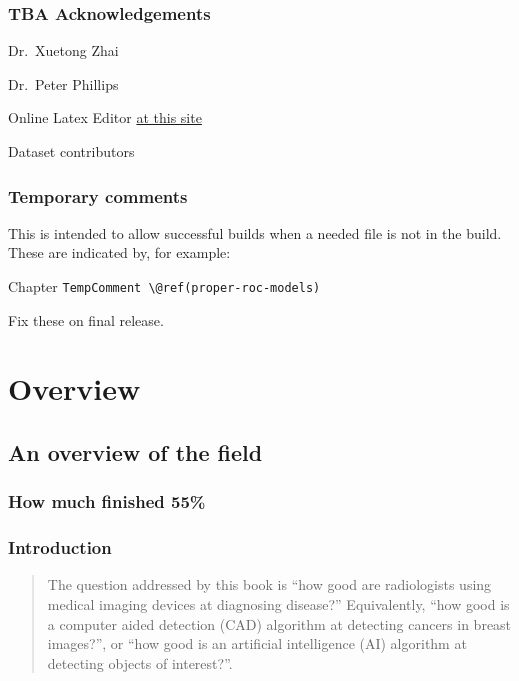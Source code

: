 \documentclass[
]{book}
\begin{document}
\hypertarget{tba-acknowledgements}{%
\section{TBA Acknowledgements}\label{tba-acknowledgements}}

Dr.~Xuetong Zhai

Dr.~Peter Phillips

Online Latex Editor \href{https://latexeditor.lagrida.com/}{at this site}

Dataset contributors

\hypertarget{temporary-comments}{%
\section{Temporary comments}\label{temporary-comments}}

This is intended to allow successful builds when a needed file is not in the build. These are indicated by, for example:

Chapter \texttt{TempComment\ \textbackslash{}@ref(proper-roc-models)}

Fix these on final release.

\hypertarget{part-overview}{%
\part*{Overview}\label{part-overview}}

\hypertarget{overview}{%
\chapter{An overview of the field}\label{overview}}

\hypertarget{overview-how-much-finished}{%
\section{How much finished 55\%}\label{overview-how-much-finished}}

\hypertarget{preliminaries-intro}{%
\section{Introduction}\label{preliminaries-intro}}

\begin{quote}
The question addressed by this book is ``how good are radiologists using medical imaging devices at diagnosing disease?'' Equivalently, ``how good is a computer aided detection (CAD) algorithm at detecting cancers in breast images?'', or ``how good is an artificial intelligence (AI) algorithm at detecting objects of interest?''.
\end{quote}
\end{document}
